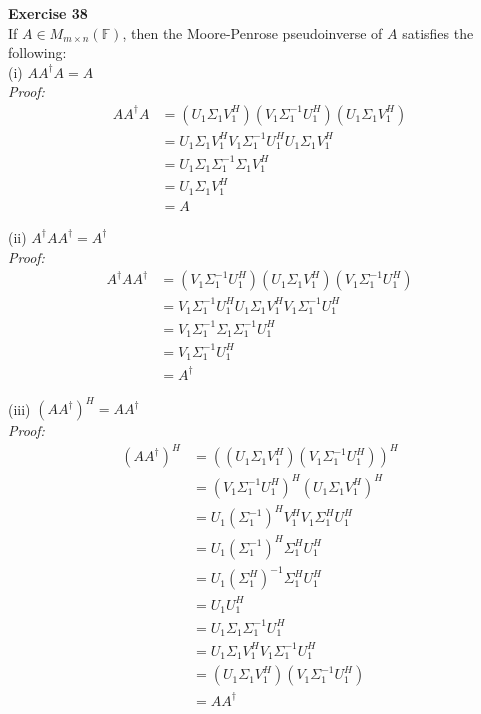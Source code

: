 \documentclass[letterpaper,12pt]{article}
\theoremstyle{definition}
\begin{document}
\textbf{Exercise 38} \\
If $A \in M_{m \times n}(\mathbb{F})$, then the Moore-Penrose pseudoinverse of $A$ satisfies the following: \\
(i) $AA^\dagger A = A $ \\
\textit{Proof:}
\begin{align*}
  AA^\dagger A &= (U_1 \Sigma_1 V_1^H) (V_1 \Sigma_1^{-1} U_1^H) (U_1 \Sigma_1 V_1^H) \\
  &= U_1 \Sigma_1 V_1^H V_1 \Sigma_1^{-1} U_1^H U_1 \Sigma_1 V_1^H \\
  &= U_1 \Sigma_1 \Sigma_1^{-1} \Sigma_1 V_1^H \\
  &= U_1 \Sigma_1 V_1^H \\
  &= A
\end{align*}

(ii) $A^\dagger AA^\dagger = A^\dagger $ \\
\textit{Proof:}
\begin{align*}
  A^\dagger AA^\dagger &= (V_1 \Sigma_1^{-1} U_1^H) (U_1 \Sigma_1 V_1^H) (V_1 \Sigma_1^{-1} U_1^H) \\
  &= V_1 \Sigma_1^{-1} U_1^H U_1 \Sigma_1 V_1^H V_1 \Sigma_1^{-1} U_1^H \\
  &= V_1 \Sigma_1^{-1} \Sigma_1 \Sigma_1^{-1} U_1^H \\
  &= V_1 \Sigma_1^{-1} U_1^H \\
  &= A^\dagger
\end{align*}

(iii) $(AA^\dagger)^H = AA^\dagger $ \\
\textit{Proof:}
\begin{align*}
  (A A^\dagger)^H &= ((U_1 \Sigma_1 V_1^H) (V_1 \Sigma_1^{-1} U_1^H))^H \\
  &= (V_1 \Sigma_1^{-1} U_1^H)^H (U_1 \Sigma_1 V_1^H)^H \\
  &= U_1 (\Sigma_1^{-1})^H V_1^H V_1 \Sigma_1^H U_1^H \\
  &= U_1 (\Sigma_1^{-1})^H \Sigma_1^H U_1^H \\
  &= U_1 (\Sigma_1^H)^{-1} \Sigma_1^H U_1^H \\
  &= U_1 U_1^H \\
  &= U_1 \Sigma_1 \Sigma_1^{-1} U_1^H \\
  &= U_1 \Sigma_1 V_1^H V_1 \Sigma_1^{-1} U_1^H \\
  &= (U_1 \Sigma_1 V_1^H) (V_1 \Sigma_1^{-1} U_1^H) \\
  &= A A^\dagger
\end{align*}
\end{document}
